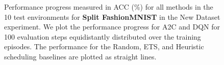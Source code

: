 \begin{figure}[t]
  \centering
  \setlength{\figwidth}{0.26\textwidth}
  \setlength{\figheight}{.14\textheight}
  
  \vspace{-3mm}
  \caption{Performance progress measured in ACC (\%) for all methods in the 10 test environments for {\bf Split FashionMNIST} in the New Dataset experiment. We plot the performance progress for A2C and DQN for 100 evaluation steps equidistantly distributed over the training episodes. The performance for the Random, ETS, and Heuristic scheduling baselines are plotted as straight lines.  }
  \label{fig:policy_rewards_fashionmnist_new_dataset_paperD}
  \vspace{-3mm}
\end{figure}

\clearpage

\clearpage

\clearpage

\clearpage

\clearpage

\clearpage


